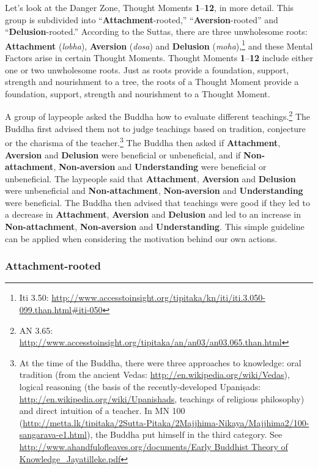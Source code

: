 Let’s look at the Danger Zone, Thought Moments \textbf{1}--\textbf{12}, in more detail. This group is subdivided into “\textbf{Attachment}-rooted,” “\textbf{Aversion}-rooted” and “\textbf{Delusion}-rooted.” According to the Suttas, there are three unwholesome roots: \textbf{Attachment} (\textit{lobha}), \textbf{Aversion} (\textit{dosa}) and \textbf{Delusion} (\textit{moha}),\footnote{Iti 3.50: \url{http://www.accesstoinsight.org/tipitaka/kn/iti/iti.3.050-099.than.html\#iti-050}} and these Mental Factors arise in certain Thought Moments. Thought Moments \textbf{1}--\textbf{12} include either one or two unwholesome roots. Just as roots provide a foundation, support, strength and nourishment to a tree, the roots of a Thought Moment provide a foundation, support, strength and nourishment to a Thought Moment.

A group of laypeople asked the Buddha how to evaluate different teachings.\footnote{AN 3.65: \url{http://www.accesstoinsight.org/tipitaka/an/an03/an03.065.than.html}} The Buddha first advised them not to judge teachings based on tradition, conjecture or the charisma of the teacher.\footnote{At the time of the Buddha, there were three approaches to knowledge: oral tradition (from the ancient Vedas: \url{http://en.wikipedia.org/wiki/Vedas}), logical reasoning (the basis of the recently-developed Upaniṣads: \url{http://en.wikipedia.org/wiki/Upanishads}, teachings of religious philosophy) and direct intuition of a teacher. In MN 100 (\url{http://metta.lk/tipitaka/2Sutta-Pitaka/2Majjhima-Nikaya/Majjhima2/100-sangarava-e1.html}), the Buddha put himself in the third category. See \url{http://www.ahandfulofleaves.org/documents/Early Buddhist Theory of Knowledge_Jayatilleke.pdf}} The Buddha then asked if \textbf{Attachment}, \textbf{Aversion} and \textbf{Delusion} were beneficial or unbeneficial, and if \textbf{Non-attachment}, \textbf{Non-aversion} and \textbf{Understanding} were beneficial or unbeneficial. The laypeople said that \textbf{Attachment}, \textbf{Aversion} and \textbf{Delusion} were unbeneficial and \textbf{Non-attachment}, \textbf{Non-aversion} and \textbf{Understanding} were beneficial. The Buddha then advised that teachings were good if they led to a decrease in \textbf{Attachment}, \textbf{Aversion} and \textbf{Delusion} and led to an increase in \textbf{Non-attachment}, \textbf{Non-aversion} and \textbf{Understanding}. This simple guideline can be applied when considering the motivation behind our own actions.

\subsubsection*{\textbf{Attachment}-rooted}

